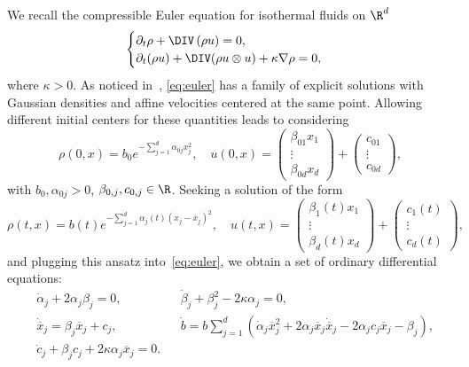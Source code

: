 We recall the compressible Euler equation for isothermal fluids on $\R^d$
\begin{equation}\label{eq:euler}
\begin{cases}
\partial_t \rho+\DIV\left(\rho u\right)=0,\\
\partial_t (\rho u) +\DIV(\rho u\otimes u)+\kappa \nabla\rho= 0,
\end{cases}
\end{equation}
where $\kappa>0$. As noticed in~\cite{Yuen12}, \eqref{eq:euler} has a family of explicit solutions with Gaussian densities and affine velocities centered at the same point. Allowing different initial centers for these quantities leads to considering
\begin{equation}\label{eq:CIgauss}
\rho(0,x) = b_0 e^{-\sum_{j=1}^d \alpha_{0j}x_j^2},\quad u(0,x) =
\begin{pmatrix}
\beta_{01}x_1\\
\vdots\\
\beta_{0d}x_d
\end{pmatrix}+
\begin{pmatrix}
c_{01}\\
\vdots\\
c_{0d}
\end{pmatrix},
\end{equation}
with $b_0,\alpha_{0j}>0$, $\beta_{0,j},c_{0,j}\in \R$. Seeking a solution of the form
\begin{equation*}
\rho(t,x) = b(t) e^{-\sum_{j=1}^d \alpha_{j}(t)\left(x_j-\overline x_j\right)^2},\quad u(t,x) =
\begin{pmatrix}
\beta_{1}(t)x_1\\
\vdots\\
\beta_{d}(t)x_d
\end{pmatrix}+
\begin{pmatrix}
c_{1}(t)\\
\vdots\\
c_{d}(t)
\end{pmatrix},
\end{equation*}
and plugging this ansatz into~\eqref{eq:euler}, we obtain a set of ordinary differential equations:
\begin{align}
& \dot \alpha_j +2\alpha_j \beta_j=0, &&
\dot\beta_j +\beta_j^2-2\kappa \alpha_j=0, \label{eq:beta}
\\
& \dot{\overline x}_j = \beta_j \overline x_j +c_j,&&
\dot b = b\sum_{j=1}^d \left(\dot \alpha_j {\overline x}_j^2+2
\alpha_j {\overline x}_j \dot{\overline x}_j -2\alpha_j c_j \overline x_j -\beta_j \right),\label{eq:b}
\\
& \dot c_j +\beta_j c_j +2\kappa \alpha_j \overline x_j = 0.\label{eq:c}
\end{align}

